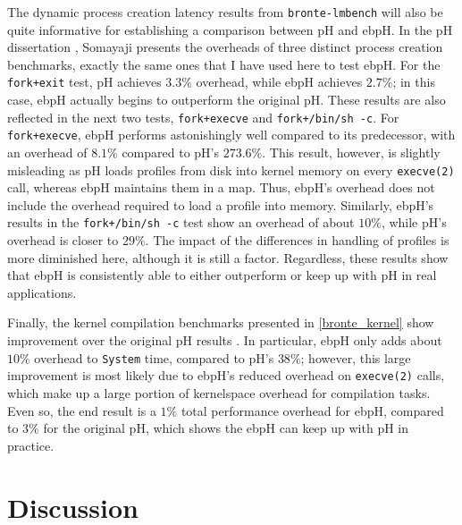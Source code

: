 \documentclass[
  12pt]{findlay}
\newcommand{\passthrough}[1]{#1}
\begin{document}
The dynamic process creation latency results from
\passthrough{\lstinline!bronte-lmbench!} will also be quite informative
for establishing a comparison between pH and ebpH. In the pH
dissertation \autocite{soma02}, Somayaji presents the overheads of three
distinct process creation benchmarks, exactly the same ones that I have
used here to test ebpH. For the \passthrough{\lstinline!fork+exit!}
test, pH achieves \(3.3\%\) overhead, while ebpH achieves \(2.7\%\); in
this case, ebpH actually begins to outperform the original pH. These
results are also reflected in the next two tests,
\passthrough{\lstinline!fork+execve!} and
\passthrough{\lstinline!fork+/bin/sh -c!}. For
\passthrough{\lstinline!fork+execve!}, ebpH performs astonishingly well
compared to its predecessor, with an overhead of \(8.1\%\) compared to
pH's \(273.6\%\). This result, however, is slightly misleading as pH
loads profiles from disk into kernel memory on every
\passthrough{\lstinline!execve(2)!} call, whereas ebpH maintains them in
a map. Thus, ebpH's overhead does not include the overhead required to
load a profile into memory. Similarly, ebpH's results in the
\passthrough{\lstinline!fork+/bin/sh -c!} test show an overhead of about
\(10\%\), while pH's overhead is closer to \(29\%\). The impact of the
differences in handling of profiles is more diminished here, although it
is still a factor. Regardless, these results show that ebpH is
consistently able to either outperform or keep up with pH in real
applications.

Finally, the kernel compilation benchmarks presented in
\autoref{bronte_kernel} show improvement over the original pH results
\autocite{soma02}. In particular, ebpH only adds about \(10\%\) overhead
to \passthrough{\lstinline!System!} time, compared to pH's \(38\%\);
however, this large improvement is most likely due to ebpH's reduced
overhead on \passthrough{\lstinline!execve(2)!} calls, which make up a
large portion of kernelspace overhead for compilation tasks. Even so,
the end result is a \(1\%\) total performance overhead for ebpH,
compared to \(3\%\) for the original pH, which shows the ebpH can keep
up with pH in practice.

\hypertarget{discussion}{%
\section{Discussion}\label{discussion}}
\end{document}
